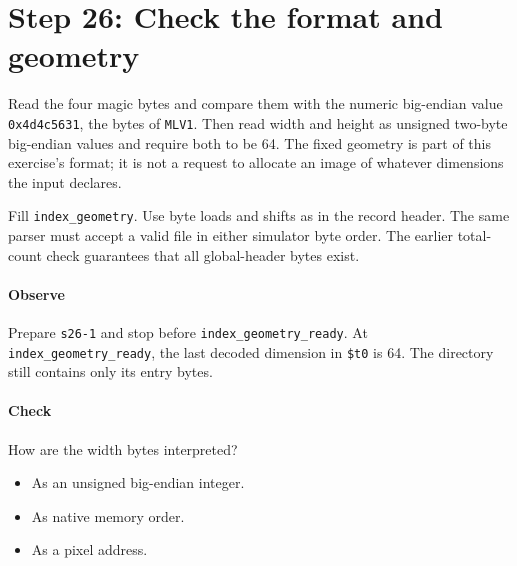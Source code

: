 \section{Step 26: Check the format and geometry}
Read the four magic bytes and compare them with the numeric big-endian
value \texttt{0x4d4c5631}, the bytes of \texttt{MLV1}. Then read width and
height as unsigned two-byte big-endian values and require both to be 64. The
fixed geometry is part of this exercise's format; it is not a request to allocate
an image of whatever dimensions the input declares.

Fill \texttt{index\_geometry}. Use byte loads and shifts as in the record
header. The same parser must accept a valid file in either simulator byte order.
The earlier total-count check guarantees that all global-header bytes exist.

\paragraph{Observe} Prepare \texttt{s26-1} and stop before
\texttt{index\_geometry\_ready}. At \texttt{index\_geometry\_ready}, the last decoded
dimension in \texttt{\$t0} is 64. The directory still contains only its entry
bytes.

\paragraph{Check} How are the width bytes interpreted?
\begin{itemize}
  \item[A.] As an unsigned big-endian integer.
  \item[B.] As native memory order.
  \item[C.] As a pixel address.
\end{itemize}
